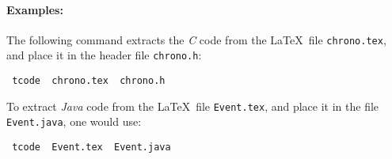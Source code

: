 \paragraph{Examples:}
The following command extracts the {\it C} code  from the \LaTeX\ file {\tt chrono.tex},
 and place it in the header file {\tt chrono.h}:

\begin {center}\tt
  tcode \ chrono.tex \ chrono.h
\end {center}

To extract {\it Java} code  from the \LaTeX\  file {\tt Event.tex},
and place it in the file {\tt Event.java}, one would use:

\begin {center}\tt
  tcode \ Event.tex \ Event.java
\end {center}

